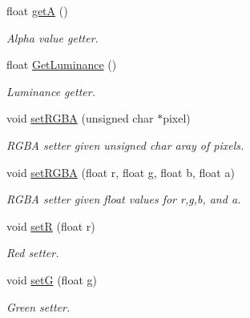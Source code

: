 \begin{DoxyCompactItemize}
float \hyperlink{classColor_a3bd02605f19eb70590822131bcdd8b08}{getA} ()
\begin{DoxyCompactList}\small\item\em Alpha value getter. \end{DoxyCompactList}\item 
float \hyperlink{classColor_a44b18556e2cc4cd58e3f5f35471262b5}{Get\+Luminance} ()
\begin{DoxyCompactList}\small\item\em Luminance getter. \end{DoxyCompactList}\item 
\mbox{\label{classColor_a8522aad9a86d305f7414ce26b50b48c2}} 
void \hyperlink{classColor_a8522aad9a86d305f7414ce26b50b48c2}{set\+R\+G\+BA} (unsigned char $\ast$pixel)
\begin{DoxyCompactList}\small\item\em R\+G\+BA setter given unsigned char aray of pixels. \end{DoxyCompactList}\item 
\mbox{\label{classColor_a108cd7208329ed0bb1b52f6901150e40}} 
void \hyperlink{classColor_a108cd7208329ed0bb1b52f6901150e40}{set\+R\+G\+BA} (float r, float g, float b, float a)
\begin{DoxyCompactList}\small\item\em R\+G\+BA setter given float values for r,g,b, and a. \end{DoxyCompactList}\item 
\mbox{\label{classColor_ac6b45342df92b65e204fe83db9360e13}} 
void \hyperlink{classColor_ac6b45342df92b65e204fe83db9360e13}{setR} (float r)
\begin{DoxyCompactList}\small\item\em Red setter. \end{DoxyCompactList}\item 
\mbox{\label{classColor_aa56d9de92a31ec8d647d1e4ec788789a}} 
void \hyperlink{classColor_aa56d9de92a31ec8d647d1e4ec788789a}{setG} (float g)
\begin{DoxyCompactList}\small\item\em Green setter. \end{DoxyCompactList}\item 
\mbox{\label{classColor_a42cac7186652ca335a08f6350e7e1e6a}} 

\end{DoxyCompactItemize}
